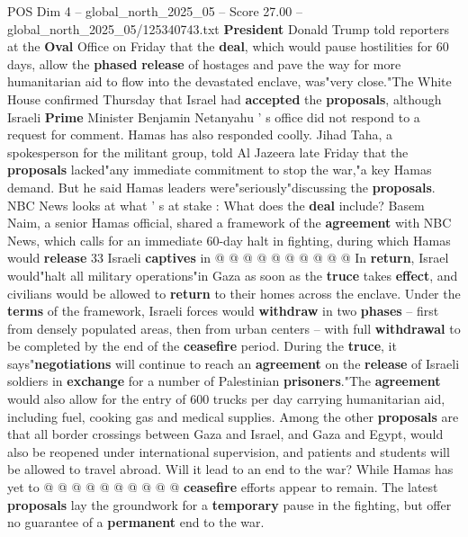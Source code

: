 \begin{textsample}{POS Dim 4 – global\_north\_2025\_05 – Score 27.00 – global\_north\_2025\_05/125340743.txt}  \label{ex:f4_pos_191}
\textbf{President} Donald Trump told reporters at the \textbf{Oval} Office on Friday that the \textbf{deal}, which would pause hostilities for 60 days, allow the \textbf{phased} \textbf{release} of hostages and pave the way for more humanitarian aid to flow into the devastated enclave, was"very close."The White House confirmed Thursday that Israel had \textbf{accepted} the \textbf{proposals}, although Israeli \textbf{Prime} Minister Benjamin Netanyahu ' s office did not respond to a request for comment.
Hamas has also responded coolly.
Jihad Taha, a spokesperson for the militant group, told Al Jazeera late Friday that the \textbf{proposals} lacked"any immediate commitment to stop the war,"a key Hamas demand.
But he said Hamas leaders were"seriously"discussing the \textbf{proposals}.
NBC News looks at what ' s at stake : What does the \textbf{deal} include?
Basem Naim, a senior Hamas official, shared a framework of the \textbf{agreement} with NBC News, which calls for an immediate 60-day halt in fighting, during which Hamas would \textbf{release} 33 Israeli \textbf{captives} in @ @ @ @ @ @ @ @ @ @ In \textbf{return}, Israel would"halt all military operations"in Gaza as soon as the \textbf{truce} takes \textbf{effect}, and civilians would be allowed to \textbf{return} to their homes across the enclave.
Under the \textbf{terms} of the framework, Israeli forces would \textbf{withdraw} in two \textbf{phases} -- first from densely populated areas, then from urban centers -- with full \textbf{withdrawal} to be completed by the end of the \textbf{ceasefire} period.
During the \textbf{truce}, it says"\textbf{negotiations} will continue to reach an \textbf{agreement} on the \textbf{release} of Israeli soldiers in \textbf{exchange} for a number of Palestinian \textbf{prisoners}."The \textbf{agreement} would also allow for the entry of 600 trucks per day carrying humanitarian aid, including fuel, cooking gas and medical supplies.
Among the other \textbf{proposals} are that all border crossings between Gaza and Israel, and Gaza and Egypt, would also be reopened under international supervision, and patients and students will be allowed to travel abroad.
Will it lead to an end to the war?
While Hamas has yet to @ @ @ @ @ @ @ @ @ @ \textbf{ceasefire} efforts appear to remain.
The latest \textbf{proposals} lay the groundwork for a \textbf{temporary} pause in the fighting, but offer no guarantee of a \textbf{permanent} end to the war.

\end{textsample}
